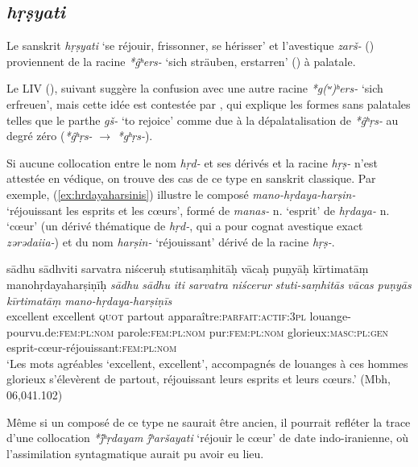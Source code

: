 \documentclass{article}
\newcommand{\ipa}[1]{{\phon\textit{#1}}}
\begin{document}
\subsection{\ipa{hṛṣyati}} \label{sec:hrsyati}
Le sanskrit \ipa{hṛṣyati} `se réjouir, frissonner, se hérisser' et l'avestique \ipa{zarš-} (\citealt[471]{cheung07dictionary}) proviennent de la racine \ipa{*ĝʰers-} `sich sträuben, erstarren' (\citealt[178]{liv}) à palatale. 

Le LIV (\citealt[198]{liv}), suivant \citet[808]{mayrhofer92ewa}  suggère la confusion avec une autre racine \ipa{*g(ʷ)ʰers-} `sich erfreuen', mais cette idée est contestée par \citet[471]{cheung07dictionary}, qui explique les formes sans palatales telles que le parthe \ipa{gš-}  `to rejoice' comme due à la dépalatalisation de \ipa{*ĝʰṛs-} au degré zéro (\ipa{*ĝʰṛs-} $\rightarrow$ \ipa{*gʰṛs-}).




Si aucune collocation entre le nom \ipa{hṛd-} et ses dérivés et la racine \ipa{hṛṣ-} n'est attestée en védique, on trouve des cas de ce type en sanskrit classique. Par exemple, (\ref{ex:hrdayaharsinis}) illustre le composé \ipa{mano-hṛdaya-harṣin-} `réjouissant les esprits et les cœurs', formé de \ipa{manas-} n. `esprit' de \ipa{hṛdaya-} n. `cœur' (un dérivé thématique de \ipa{hṛd-}, qui a pour cognat avestique exact \ipa{zərədaiia-}) et du nom \ipa{harṣin-} `réjouissant' dérivé de la racine \ipa{hṛṣ-}. 

\begin{exe}
\ex \label{ex:hrdayaharsinis}
\glt sādhu sādhviti sarvatra niśceruḥ stutisaṃhitāḥ
\glt vācaḥ puṇyāḥ kīrtimatāṃ manohṛdayaharṣiṇīḥ
\gll 
\ipa{sādhu} \ipa{sādhu} \ipa{iti} \ipa{sarvatra} \ipa{niścerur} \ipa{stuti-saṃhitās} 
\ipa{vācas} \ipa{puṇyās} \ipa{kīrtimatāṃ} \ipa{mano-hṛdaya-harṣiṇīs}\\
excellent excellent \textsc{quot} partout apparaître:\textsc{parfait:actif:3pl} louange-pourvu.de:\textsc{fem:pl:nom} parole:\textsc{fem:pl:nom}
pur:\textsc{fem:pl:nom} glorieux:\textsc{masc:pl:gen} esprit-cœur-réjouissant:\textsc{fem:pl:nom} \\ 
\glt `Les mots agréables `excellent, excellent', accompagnés de louanges à ces  hommes glorieux s'élevèrent de partout, réjouissant leurs esprits et leurs cœurs.' (Mbh, 06,041.102)
\end{exe}
Même si un composé de ce type ne saurait être ancien, il pourrait refléter la trace d'une collocation \ipa{*j́ʰṛdayam j́ʰaršayati} `réjouir le cœur' de date indo-iranienne, où l'assimilation syntagmatique aurait pu avoir eu lieu.
\end{document}
